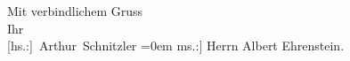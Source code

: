 \pstart
           Mit verbindlichem Gruss{\\[\baselineskip]} Ihr{\\[\baselineskip]}\spacefill\mbox{{[}hs.:{]} Arthur Schnitzler}\pend
           \leftskip=0em{}
\pstart
           \noindent{}{[}ms.:{]} Herrn Albert Ehrenstein.\pend
           \endnumbering{}  \newcommand{\dateiname}{L01825}\newcommand{\titel}{Arthur Schnitzler an Albert Ehrenstein, 20. 1. 1909}\newcommand{\editorInnen}{Martin Anton Müller und Gerd-Hermann Susen}
